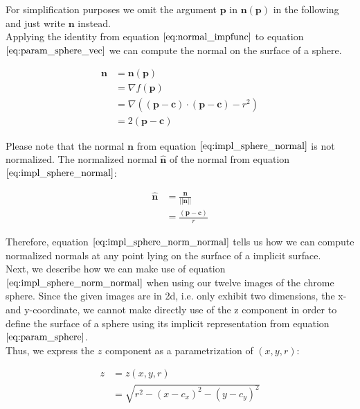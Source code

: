 \documentclass{paper}
\begin{document}
\begin{itemize}
For simplification purposes we omit the argument $\textbf{p}$ in $\textbf{n}(\textbf{p})$ in the following and just write $\textbf{n}$ instead. \\

Applying the identity from equation $\ref{eq:normal_impfunc}$ to equation $\ref{eq:param_sphere_vec}$ we can compute the normal on the surface of a sphere.

\begin{align}
\textbf{n}
&= \textbf{n}(\textbf{p}) \nonumber \\
&= \nabla f(\textbf{p})  \nonumber \\
&= \nabla \left((\textbf{p}-\textbf{c}) \cdot (\textbf{p}-\textbf{c}) -r^2\right) \nonumber \\
&= 2(\textbf{p}-\textbf{c})
\label{eq:impl_sphere_normal}
\end{align}

Please note that the normal $\textbf{n}$ from equation $\ref{eq:impl_sphere_normal}$ is not 
normalized. The normalized normal $\hat{\textbf{n}}$ of the normal from equation $\ref{eq:impl_sphere_normal}$:

\begin{align}
\hat{\textbf{n}}
&= \frac{\textbf{n}}{||\textbf{n}||} \nonumber \\
&= \frac{(\textbf{p}-\textbf{c})}{r}
\label{eq:impl_sphere_norm_normal}
\end{align}

Therefore, equation $\ref{eq:impl_sphere_norm_normal}$ tells us how we can compute normalized normals at any point lying on the surface of a implicit surface. \\

Next, we describe how we can make use of equation $\ref{eq:impl_sphere_norm_normal}$ when using our twelve images of the chrome sphere. Since the given images are in 2d, i.e. only exhibit two dimensions, the x-and y-coordinate, we cannot make directly use of the z component in order to define the surface of a sphere using its implicit representation from equation $\ref{eq:param_sphere}$. \\

Thus, we express the $z$ component as a parametrization of $(x,y,r)$:

\begin{align}
z 
&= z(x,y,r) \nonumber \\
&= \sqrt{r^2 - (x-c_x)^2 - (y-c_y)^2}
\label{eq:z_comp}
\end{align}


\end{itemize}
\end{document}

